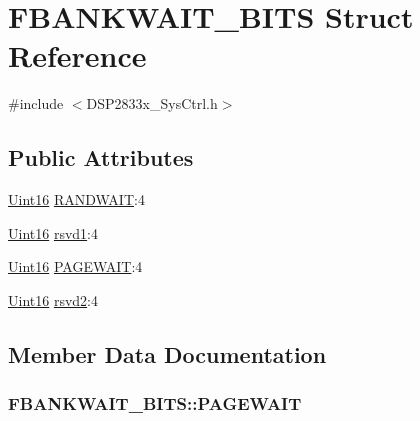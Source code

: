 \hypertarget{struct_f_b_a_n_k_w_a_i_t___b_i_t_s}{}\section{F\+B\+A\+N\+K\+W\+A\+I\+T\+\_\+\+B\+I\+T\+S Struct Reference}
\label{struct_f_b_a_n_k_w_a_i_t___b_i_t_s}


{\ttfamily \#include $<$D\+S\+P2833x\+\_\+\+Sys\+Ctrl.\+h$>$}

\subsection*{Public Attributes}
\begin{DoxyCompactItemize}
\item 
\hyperlink{_d_s_p2833x___device_8h_a59a9f6be4562c327cbfb4f7e8e18f08b}{Uint16} \hyperlink{struct_f_b_a_n_k_w_a_i_t___b_i_t_s_a51e4f58ff980ecf2107b921d8511c5bb}{R\+A\+N\+D\+W\+A\+I\+T}\+:4
\item 
\hyperlink{_d_s_p2833x___device_8h_a59a9f6be4562c327cbfb4f7e8e18f08b}{Uint16} \hyperlink{struct_f_b_a_n_k_w_a_i_t___b_i_t_s_a0e349785deb6785684dc6171b0c01873}{rsvd1}\+:4
\item 
\hyperlink{_d_s_p2833x___device_8h_a59a9f6be4562c327cbfb4f7e8e18f08b}{Uint16} \hyperlink{struct_f_b_a_n_k_w_a_i_t___b_i_t_s_ab71734d37cf0bcf6dec57611e02b16fd}{P\+A\+G\+E\+W\+A\+I\+T}\+:4
\item 
\hyperlink{_d_s_p2833x___device_8h_a59a9f6be4562c327cbfb4f7e8e18f08b}{Uint16} \hyperlink{struct_f_b_a_n_k_w_a_i_t___b_i_t_s_a4c11f6983334381618df77caee206ecf}{rsvd2}\+:4
\end{DoxyCompactItemize}


\subsection{Member Data Documentation}
\hypertarget{struct_f_b_a_n_k_w_a_i_t___b_i_t_s_ab71734d37cf0bcf6dec57611e02b16fd}{}
\subsubsection[{P\+A\+G\+E\+W\+A\+I\+T}]{ F\+B\+A\+N\+K\+W\+A\+I\+T\+\_\+\+B\+I\+T\+S\+::\+P\+A\+G\+E\+W\+A\+I\+T}\label{struct_f_b_a_n_k_w_a_i_t___b_i_t_s_ab71734d37cf0bcf6dec57611e02b16fd}
\hypertarget{struct_f_b_a_n_k_w_a_i_t___b_i_t_s_a51e4f58ff980ecf2107b921d8511c5bb}{}
